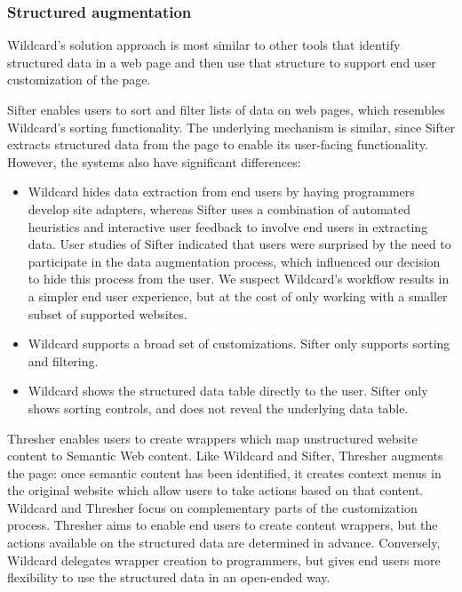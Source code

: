 \documentclass[english,submission]{programming}
\providecommand{\tightlist}{%
  \setlength{\itemsep}{0pt}\setlength{\parskip}{0pt}}
\begin{document}
\hypertarget{structured-augmentation}{%
\subsubsection{Structured augmentation}\label{structured-augmentation}}

Wildcard's solution approach is most similar to other tools that
identify structured data in a web page and then use that structure to
support end user customization of the page.

Sifter \autocite{huynh2006} enables users to sort and filter lists of
data on web pages, which resembles Wildcard's sorting functionality. The
underlying mechanism is similar, since Sifter extracts structured data
from the page to enable its user-facing functionality. However, the
systems also have significant differences:

\begin{itemize}
\tightlist
\item
  Wildcard hides data extraction from end users by having programmers
  develop site adapters, whereas Sifter uses a combination of automated
  heuristics and interactive user feedback to involve end users in
  extracting data. User studies of Sifter indicated that users were
  surprised by the need to participate in the data augmentation process,
  which influenced our decision to hide this process from the user. We
  suspect Wildcard's workflow results in a simpler end user experience,
  but at the cost of only working with a smaller subset of supported
  websites.
\item
  Wildcard supports a broad set of customizations. Sifter only supports
  sorting and filtering.
\item
  Wildcard shows the structured data table directly to the user. Sifter
  only shows sorting controls, and does not reveal the underlying data
  table.
\end{itemize}

Thresher \autocite{hogue2005} enables users to create wrappers which map
unstructured website content to Semantic Web content. Like Wildcard and
Sifter, Thresher augments the page: once semantic content has been
identified, it creates context menus in the original website which allow
users to take actions based on that content. Wildcard and Thresher focus
on complementary parts of the customization process. Thresher aims to
enable end users to create content wrappers, but the actions available
on the structured data are determined in advance. Conversely, Wildcard
delegates wrapper creation to programmers, but gives end users more
flexibility to use the structured data in an open-ended way.
\end{document}
